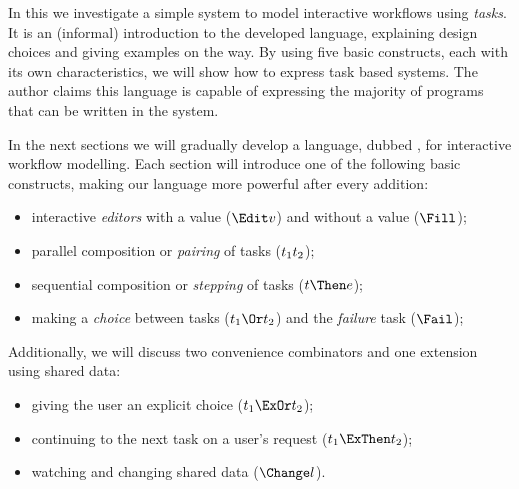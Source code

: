 
In this we investigate a simple system to model interactive workflows using \emph{tasks}.
It is an (informal) introduction to the developed language,
explaining design choices and giving examples on the way.
By using five basic constructs,
each with its own characteristics,
we will show how to express task based systems.
The author claims this language is capable of expressing the majority of programs that can be written in the \ITASKS \cite{plasmeijer2011itasks} system.

In the next sections we will gradually develop a language, dubbed \Lang, for interactive workflow modelling.
Each section will introduce one of the following basic constructs,
making our language more powerful after every addition:
\begin{itemize}
  \item interactive \emph{editors} with a value ($\Edit v$) and without a value ($\Fill$);
  \item parallel composition or \emph{pairing} of tasks ($t_1 \relax t_2$);
  \item sequential composition or \emph{stepping} of tasks ($t \Then e$);
  \item making a \emph{choice} between tasks ($t_1 \Or t_2$) and the \emph{failure} task ($\Fail$);
\end{itemize}
Additionally, we will discuss two convenience combinators and one extension using shared data:
\begin{itemize}
  \item giving the user an explicit choice ($t_1 \ExOr t_2$);
  \item continuing to the next task on a user's request ($t_1 \ExThen t_2$);
  \item watching and changing shared data ($\Change l$).
\end{itemize}

